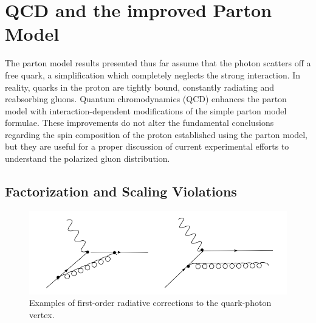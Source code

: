 

\section{QCD and the improved Parton Model}

The parton model results presented thus far assume that the photon scatters off
a free quark, a simplification which completely neglects the strong interaction.
In reality, quarks in the proton are tightly bound, constantly radiating and
reabsorbing gluons. Quantum chromodynamics (QCD) enhances the parton model with
interaction-dependent modifications of the simple parton model formulae. These
improvements do not alter the fundamental conclusions regarding the spin
composition of the proton established using the parton model, but they are
useful for a proper discussion of current experimental efforts to understand the
polarized gluon distribution.

\subsection{Factorization and Scaling Violations}

\begin{figure}
  \includegraphics[width=1.0\textwidth]{figures/radiative-corrections}
  \caption{Examples of first-order radiative corrections to the quark-photon vertex.}
  \label{fig:radiative-corrections}
\end{figure}

